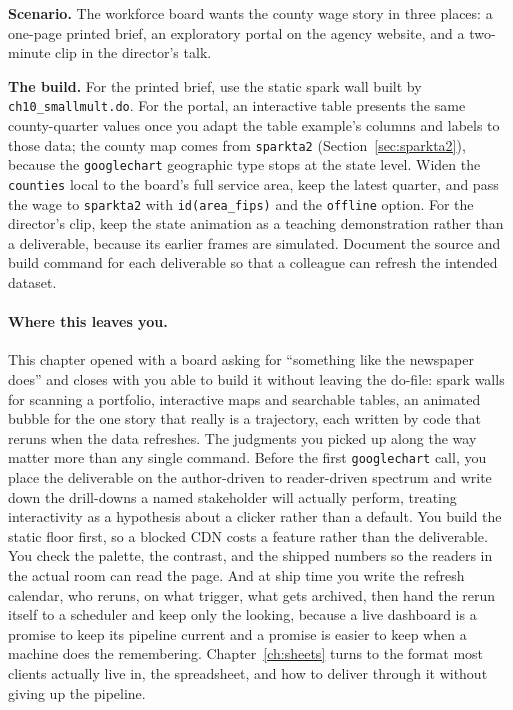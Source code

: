 \begin{appliedexample}\label{ae:ch10-threedeliv}
\textbf{Scenario.} The workforce board wants the county wage story in three places: a one-page printed brief, an exploratory portal on the agency website, and a two-minute clip in the director's talk.

\medskip
\textbf{The build.} For the printed brief, use the static spark wall built by \texttt{ch10\_smallmult.do}. For the portal, an interactive table presents the same county-quarter values once you adapt the table example's columns and labels to those data; the county map comes from \texttt{sparkta2} (Section~\ref{sec:sparkta2}), because the \texttt{googlechart} geographic type stops at the state level. Widen the \texttt{counties} local to the board's full service area, keep the latest quarter, and pass the wage to \texttt{sparkta2} with \texttt{id(area\_fips)} and the \texttt{offline} option. For the director's clip, keep the state animation as a teaching demonstration rather than a deliverable, because its earlier frames are simulated. Document the source and build command for each deliverable so that a colleague can refresh the intended dataset.
\end{appliedexample}

\paragraph{Where this leaves you.} This chapter opened with a board asking for \enquote{something like the newspaper does} and closes with you able to build it without leaving the do-file: spark walls for scanning a portfolio, interactive maps and searchable tables, an animated bubble for the one story that really is a trajectory, each written by code that reruns when the data refreshes. The judgments you picked up along the way matter more than any single command. Before the first \texttt{googlechart} call, you place the deliverable on the author-driven to reader-driven spectrum and write down the drill-downs a named stakeholder will actually perform, treating interactivity as a hypothesis about a clicker rather than a default. You build the static floor first, so a blocked CDN costs a feature rather than the deliverable. You check the palette, the contrast, and the shipped numbers so the readers in the actual room can read the page. And at ship time you write the refresh calendar, who reruns, on what trigger, what gets archived, then hand the rerun itself to a scheduler and keep only the looking, because a live dashboard is a promise to keep its pipeline current and a promise is easier to keep when a machine does the remembering. Chapter~\ref{ch:sheets} turns to the format most clients actually live in, the spreadsheet, and how to deliver through it without giving up the pipeline.

